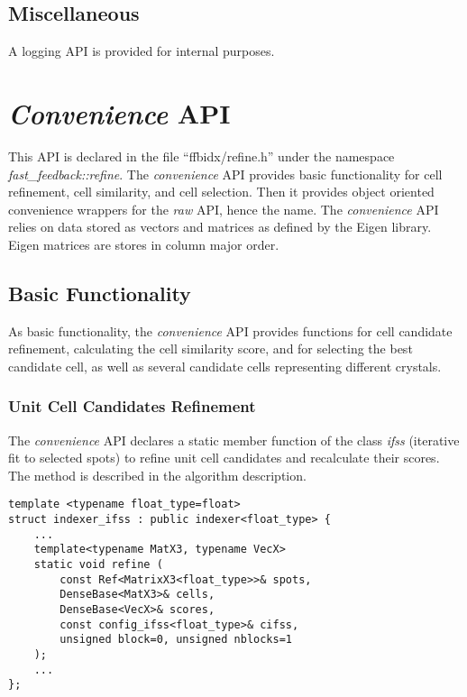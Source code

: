 \documentclass[a4paper,10pt]{article}
\begin{document}
\subsection{Miscellaneous}

A logging API is provided for internal purposes.

\section{\emph{Convenience} API}

This API is declared in the file ``ffbidx/refine.h'' under the namespace \emph{fast\_feed\-back::re\-fine}. The \emph{convenience} API provides basic functionality for cell refinement, cell similarity, and cell selection. Then it provides object oriented convenience wrappers for the \emph{raw} API, hence the name. The \emph{convenience} API relies on data stored as vectors and matrices as defined by the Eigen library. Eigen matrices are stores in column major order.

\subsection{Basic Functionality}

As basic functionality, the \emph{convenience} API provides functions for cell candidate refinement, calculating the cell similarity score, and for selecting the best candidate cell, as well as several candidate cells representing different crystals.

\subsubsection{Unit Cell Candidates Refinement}

The \emph{convenience} API declares a static member function of the class \emph{ifss} (iterative fit to selected spots) to refine unit cell candidates and recalculate their scores. The method is described in the algorithm description.

\begin{lstlisting}
template <typename float_type=float>
struct indexer_ifss : public indexer<float_type> {
    ...
    template<typename MatX3, typename VecX>
    static void refine (
        const Ref<MatrixX3<float_type>>& spots,
        DenseBase<MatX3>& cells,
        DenseBase<VecX>& scores,
        const config_ifss<float_type>& cifss,
        unsigned block=0, unsigned nblocks=1
    );
    ...
};
\end{lstlisting}
\end{document}
